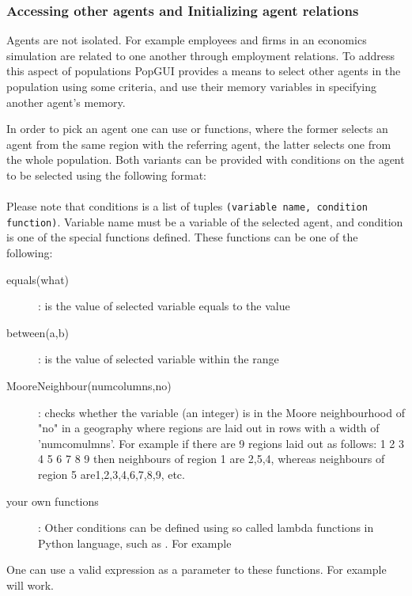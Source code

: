 \documentclass[10pt]{article}
\begin{document}
\subsubsection{Accessing other agents and Initializing agent relations}
Agents are not isolated. For example employees and firms in an economics simulation are related to one another through employment relations. To address this aspect of populations PopGUI provides a means to select other agents in the population using some criteria, and use their memory variables in specifying another agent's memory.

In order to pick an agent one can use  or  functions, where the former selects an agent from the same region with the referring agent, the latter selects one from the whole population. Both variants can be provided with conditions on the agent to be selected using the following format:\\
\\
Please note that conditions is a list of tuples {\tt (variable name, condition function)}. Variable name must be a variable of the selected agent, and condition is one of the special functions defined. These functions can be one of the following:
\begin{description}
   \item[equals(what)]: is the value of selected variable equals  to the value
   \item[between(a,b)]: is the value of selected variable within the range
   \item[MooreNeighbour(numcolumns,no)]: checks whether the variable (an integer) is in the Moore neighbourhood of "no" in a geography where regions are laid out in rows with a width of 'numcomulmns'. For example if there are 9 regions laid out as follows:
      1    2    3
      4    5    6
      7    8    9
    then neighbours of region 1 are 2,5,4, whereas neighbours of region 5 are1,2,3,4,6,7,8,9, etc.
   \item[your own functions]: Other conditions can be defined using so called lambda functions in Python language, such as  . For example 
\end{description}
One can use a valid expression as a parameter to these functions. For example  will work.
\end{document}
